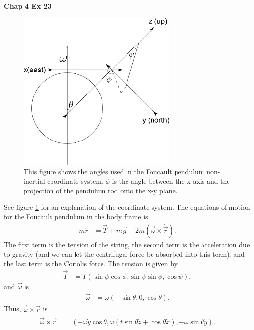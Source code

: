 \documentclass[10pt]{article}
\begin{document}
\textbf{Chap 4 Ex 23}\\
\begin{figure}[h!]
    \centering
    \includegraphics[width=0.7\textwidth]{4Ex23.png}
    \caption{This figure shows the angles used in the Foucault pendulum 
    non-inertial coordinate system.  $\phi$ is the angle between the x axis
    and the projection of the pendulum rod onto the x-y plane.}
  \label{fig:4-23}
\end{figure}
See figure \ref{fig:4-23} for an explanation of the coordinate system.
The equations of motion for the Foucault pendulum in the body frame is
\begin{align*}
  m\ddot r &= \vec T + m\vec g - 2m(\vec\omega\times\dot\vec r).
\end{align*}
The first term is the tension of the string, the second term is the 
acceleration due to gravity (and we can let the centrifugal force be 
absorbed into this term), and the last term is the Coriolis force.
The tension is given by
\begin{align*}
  \vec T &= T(\sin\psi\cos\phi, \sin\psi\sin\phi, \cos\psi),
\end{align*}
and $\vec\omega$ is
\begin{align*}
  \vec\omega &= \omega(-\sin\theta, 0, \cos\theta).
\end{align*}
Thus, $\vec\omega\times\dot\vec r$ is
\begin{align*}
  \vec\omega\times\dot\vec r &= (-\omega\dot y\cos\theta, \omega(t\sin\theta\dot z+\cos\theta\dot x), -\omega\sin\theta\dot y).
\end{align*}
\end{document}
